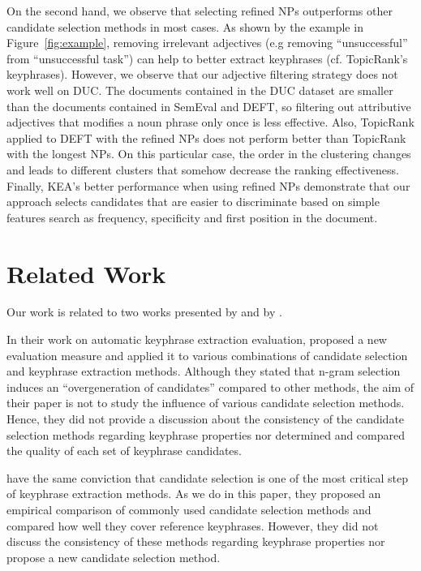       On the second hand, we observe that selecting refined NPs outperforms
      other candidate selection methods in most cases. As shown by the example
      in Figure~\ref{fig:example}, removing irrelevant adjectives (e.g removing
      ``unsuccessful'' from ``unsuccessful task'') can help to better extract
      keyphrases (cf. TopicRank's keyphrases). However, we observe that
      our adjective filtering strategy does not work well on DUC. The documents
      contained in the DUC dataset are smaller than the documents contained in
      SemEval and DEFT, so filtering out attributive adjectives that modifies a
      noun phrase only once is less effective. Also, TopicRank applied to DEFT
      with the refined NPs does not perform better than TopicRank with the
      longest NPs. On this particular case, the order in the clustering changes
      and leads to different clusters that somehow decrease the ranking
      effectiveness. Finally, KEA's better performance when using refined NPs
      demonstrate that our approach selects candidates that are easier to
      discriminate based on simple features search as frequency, specificity and
      first position in the document.

\section{Related Work}
\label{sec:related_work}
  Our work is related to two works presented by 
  and by .

  In their work on automatic keyphrase extraction evaluation,
   proposed a new evaluation measure and applied it
  to various combinations of candidate selection and keyphrase extraction
  methods. Although they stated that n-gram selection induces an
  ``overgeneration of candidates'' compared to other methods, the aim of their
  paper is not to study the influence of various candidate selection methods.
  Hence, they did not provide a discussion about the consistency of the
  candidate selection methods regarding keyphrase properties nor determined and
  compared the quality of each set of keyphrase candidates.

   have the same conviction
  that candidate selection is one of the most critical step of keyphrase
  extraction methods. As we do in this paper, they proposed an empirical
  comparison of commonly used candidate selection methods and compared how well
  they cover reference keyphrases. However, they did not discuss the consistency
  of these methods regarding keyphrase properties nor propose a new candidate
  selection method.

